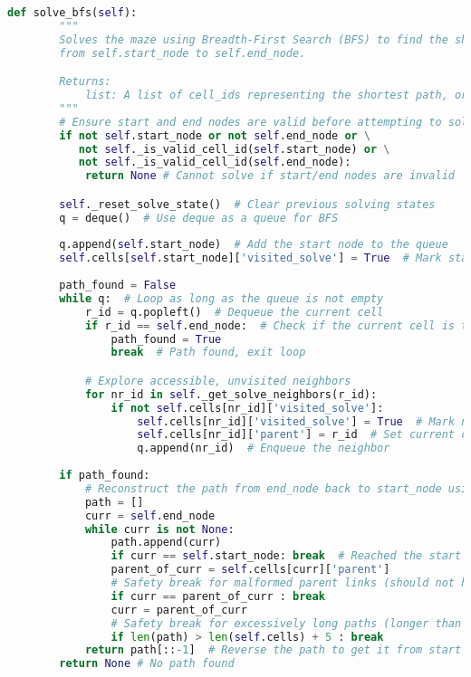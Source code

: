 \documentclass[UTF8]{report}
\theoremstyle{MyLineTheoremStyle} %
\theoremstyle{MyBlockTheoremStyle} %
\theoremstyle{MySubsubsectionStyle} %
\begin{document}
\begin{lstlisting}[language=Python, caption={迷宫生成与求解程序代码}]
    def solve_bfs(self):
        """
        Solves the maze using Breadth-First Search (BFS) to find the shortest path
        from self.start_node to self.end_node.

        Returns:
            list: A list of cell_ids representing the shortest path, or None if no path is found.
        """
        # Ensure start and end nodes are valid before attempting to solve
        if not self.start_node or not self.end_node or \
           not self._is_valid_cell_id(self.start_node) or \
           not self._is_valid_cell_id(self.end_node):
            return None # Cannot solve if start/end nodes are invalid

        self._reset_solve_state()  # Clear previous solving states
        q = deque()  # Use deque as a queue for BFS
        
        q.append(self.start_node)  # Add the start node to the queue
        self.cells[self.start_node]['visited_solve'] = True  # Mark start node as visited
        
        path_found = False
        while q:  # Loop as long as the queue is not empty
            r_id = q.popleft()  # Dequeue the current cell
            if r_id == self.end_node:  # Check if the current cell is the end node
                path_found = True
                break  # Path found, exit loop

            # Explore accessible, unvisited neighbors
            for nr_id in self._get_solve_neighbors(r_id):
                if not self.cells[nr_id]['visited_solve']:
                    self.cells[nr_id]['visited_solve'] = True  # Mark neighbor as visited
                    self.cells[nr_id]['parent'] = r_id  # Set current cell as parent (for path reconstruction)
                    q.append(nr_id)  # Enqueue the neighbor
        
        if path_found:
            # Reconstruct the path from end_node back to start_node using parent pointers
            path = []
            curr = self.end_node
            while curr is not None:
                path.append(curr)
                if curr == self.start_node: break  # Reached the start of the path
                parent_of_curr = self.cells[curr]['parent']
                # Safety break for malformed parent links (should not happen in correct BFS)
                if curr == parent_of_curr : break 
                curr = parent_of_curr
                # Safety break for excessively long paths (longer than total number of cells)
                if len(path) > len(self.cells) + 5 : break 
            return path[::-1]  # Reverse the path to get it from start to end
        return None # No path found


\end{lstlisting}
\end{document}
